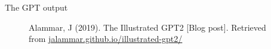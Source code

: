 \documentclass[10pt]{beamer}
\begin{document}
\begin{frame}{The GPT output}
\begin{figure}[h]
\caption{Alammar, J (2019). The Illustrated GPT2 [Blog post]. Retrieved from \href{https://jalammar.github.io/illustrated-gpt2/}{jalammar.github.io/illustrated-gpt2/}
}
\end{figure}

\end{frame}
\end{document}
